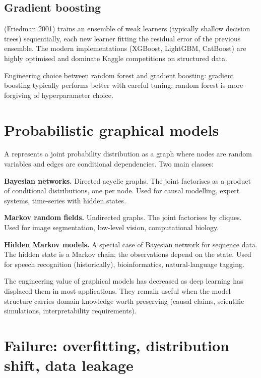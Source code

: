 \subsection{Gradient boosting}

 (Friedman 2001) trains an ensemble of weak learners (typically shallow decision trees) sequentially, each new learner fitting the residual error of the previous ensemble. The modern implementations (XGBoost, LightGBM, CatBoost) are highly optimised and dominate Kaggle competitions on structured data.

Engineering choice between random forest and gradient boosting: gradient boosting typically performs better with careful tuning; random forest is more forgiving of hyperparameter choice.

\section{Probabilistic graphical models}

A  represents a joint probability distribution as a graph where nodes are random variables and edges are conditional dependencies. Two main classes:

\textbf{Bayesian networks.} Directed acyclic graphs. The joint factorises as a product of conditional distributions, one per node. Used for causal modelling, expert systems, time-series with hidden states.

\textbf{Markov random fields.} Undirected graphs. The joint factorises by cliques. Used for image segmentation, low-level vision, computational biology.

\textbf{Hidden Markov models.} A special case of Bayesian network for sequence data. The hidden state is a Markov chain; the observations depend on the state. Used for speech recognition (historically), bioinformatics, natural-language tagging.

The engineering value of graphical models has decreased as deep learning has displaced them in most applications. They remain useful when the model structure carries domain knowledge worth preserving (causal claims, scientific simulations, interpretability requirements).

\section{Failure: overfitting, distribution shift, data leakage}

